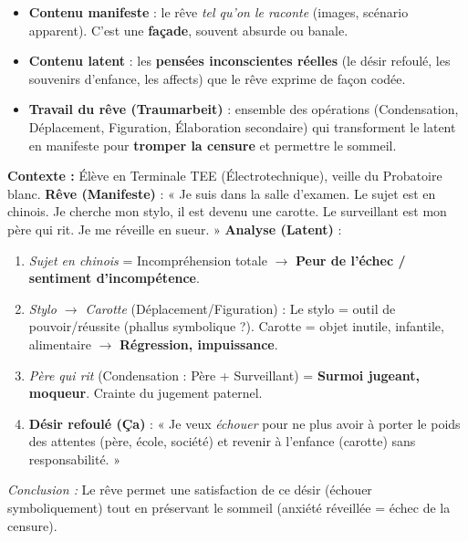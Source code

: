 \documentclass[11pt]{article}
\begin{document}
\begin{definition}
\begin{itemize}
    \item \textbf{Contenu manifeste} : le rêve \emph{tel qu'on le raconte} (images, scénario apparent). C'est une \textbf{façade}, souvent absurde ou banale.
    \item \textbf{Contenu latent} : les \textbf{pensées inconscientes réelles} (le désir refoulé, les souvenirs d'enfance, les affects) que le rêve exprime de façon codée.
    \item \textbf{Travail du rêve (Traumarbeit)} : ensemble des opérations (Condensation, Déplacement, Figuration, Élaboration secondaire) qui transforment le latent en manifeste pour \textbf{tromper la censure} et permettre le sommeil.
\end{itemize}
\end{definition}

\begin{exemplebox}
\textbf{Contexte :} Élève en Terminale TEE (Électrotechnique), veille du Probatoire blanc.
\textbf{Rêve (Manifeste)} : « Je suis dans la salle d'examen. Le sujet est en chinois. Je cherche mon stylo, il est devenu une carotte. Le surveillant est mon père qui rit. Je me réveille en sueur. »
\textbf{Analyse (Latent)} :
\begin{enumerate}
    \item \emph{Sujet en chinois} = Incompréhension totale $\rightarrow$ \textbf{Peur de l'échec / sentiment d'incompétence}.
    \item \emph{Stylo $\rightarrow$ Carotte} (Déplacement/Figuration) : Le stylo = outil de pouvoir/réussite (phallus symbolique ?). Carotte = objet inutile, infantile, alimentaire $\rightarrow$ \textbf{Régression, impuissance}.
    \item \emph{Père qui rit} (Condensation : Père + Surveillant) = \textbf{Surmoi jugeant, moqueur}. Crainte du jugement paternel.
    \item \textbf{Désir refoulé (Ça)} : « Je veux \emph{échouer} pour ne plus avoir à porter le poids des attentes (père, école, société) et revenir à l'enfance (carotte) sans responsabilité. »
\end{enumerate}
\emph{Conclusion :} Le rêve permet une satisfaction de ce désir (échouer symboliquement) tout en préservant le sommeil (anxiété réveillée = échec de la censure).
\end{exemplebox}
\end{document}
